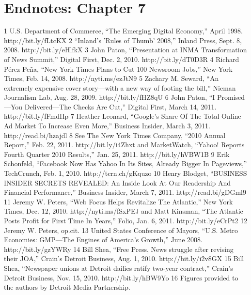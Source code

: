 \section{Endnotes: Chapter 7}
1 U.S. Department of Commerce, ``The Emerging Digital Economy,'' April 1998.
http://bit.ly/fLtcKX
2 ``Inland's 'Rules of Thumb' 2008,'' Inland Press, Sept. 8, 2008. http://bit.ly/eHlfkX
3 John Paton, ``Presentation at INMA Transformation of News Summit,'' Digital First,
Dec. 2, 2010. http://bit.ly/dT0D3R
4 Richard Pérez-Peña, ``New York Times Plans to Cut 100 Newsroom Jobs,'' New York Times,
Feb. 14, 2008. http://nyti.ms/ezJtN9
5 Zachary M. Seward, ``An extremely expensive cover story—with a new way of footing the
bill,'' Nieman Journalism Lab, Aug. 28, 2009. http://bit.ly/fHZ8qU
6 John Paton, ``I Promised—You Delivered—The Checks Are Cut,'' Digital First,
March 14, 2011. http://bit.ly/fFmdHp
7 Heather Leonard, ``Google's Share Of The Total Online Ad Market To Increase Even More,''
Business Insider, March 3, 2011. http://read.bi/hzajdl
8 See The New York Times Company, ``2010 Annual Report,'' Feb. 22, 2011.
http://bit.ly/i4Zhxt and MarketWatch, ``Yahoo! Reports Fourth Quarter 2010 Results,''
Jan. 25, 2011. http://bit.ly/hVBW1B
9 Erik Schonfeld, ``Facebook Now Has Yahoo In Its Sites, Already Bigger In Pageviews,''
TechCrunch, Feb. 1, 2010. http://tcrn.ch/gKquzo
10 Henry Blodget, ``BUSINESS INSIDER SECRETS REVEALED: An Inside Look At
Our Readership And Financial Performance,'' Business Insider, March 7, 2011.
http://read.bi/gDGml9
11 Jeremy W. Peters, ``Web Focus Helps Revitalize The Atlantic,'' New York Times, Dec. 12, 2010.
http://nyti.ms/fSxPEJ and Matt Kinsman, ``The Atlantic Posts Profit for First Time In Years,''
Folio, Jan. 6, 2011. http://bit.ly/eCrPt2
12 Jeremy W. Peters, op.cit.
13 United States Conference of Mayors, ``U.S. Metro Economies: GMP—The Engines of
America's Growth,'' June 2008. http://bit.ly/gzYWRy
14 Bill Shea, ``Free Press, News struggle after revising their JOA,'' Crain's Detroit Business,
Aug. 1, 2010. http://bit.ly/i2v8GX
15 Bill Shea, ``Newspaper unions at Detroit dailies ratify two-year contract,'' Crain's Detroit
Business, Nov. 15, 2010. http://bit.ly/hBW9Yo
16 Figures provided to the authors by Detroit Media Partnership.

